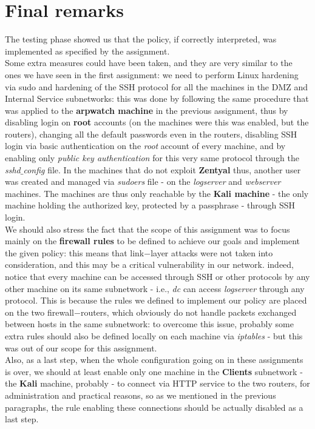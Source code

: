 \section{Final remarks}
The testing phase showed us that the policy, if correctly interpreted, was implemented as specified by the assignment.\\
Some extra measures could have been taken, and they are very similar to the ones we have seen in the first assignment: we need to perform Linux hardening via sudo and hardening of the SSH protocol for all the machines in the DMZ and Internal Service subnetworks: this was done by following the same procedure that was applied to the \textbf{arpwatch machine} in the previous assignment, thus by disabling login on \textbf{root} accounts (on the machines were this was enabled, but the routers), changing all the default passwords even in the routers, disabling SSH login via basic authentication on the \textit{root} account of every machine, and by enabling only \textit{public key authentication} for this very same protocol through the \textit{sshd$\_$config} file. In the machines that do not exploit \textbf{Zentyal} thus, another user was created and managed via \textit{sudoers} file - on the \textit{logserver} and \textit{webserver} machines. The machines are thus only reachable by the \textbf{Kali machine} - the only machine holding the authorized key, protected by a passphrase - through SSH login.\\
We should also stress the fact that the scope of this assignment was to focus mainly on the \textbf{firewall rules} to be defined to achieve our goals and implement the given policy: this means that link$-$layer attacks were not taken into consideration, and this may be a critical vulnerability in our network. indeed, notice that every machine can be accessed through SSH or other protocols by any other machine on its same subnetwork - i.e., \textit{dc} can access \textit{logserver} through any protocol. This is because the rules we defined to implement our policy are placed on the two firewall$-$routers, which obviously do not handle packets exchanged between hosts in the same subnetwork: to overcome this issue, probably some extra rules should also be defined locally on each machine via \textit{iptables} - but this was out of our scope for this assignment.\\
Also, as a last step, when the whole configuration going on in these assignments is over, we should at least enable only one machine in the \textbf{Clients} subnetwork - the \textbf{Kali} machine, probably - to connect via HTTP service to the two routers, for administration and practical reasons, so as we mentioned in the previous paragraphs, the rule enabling these connections should be actually disabled as a last step.
